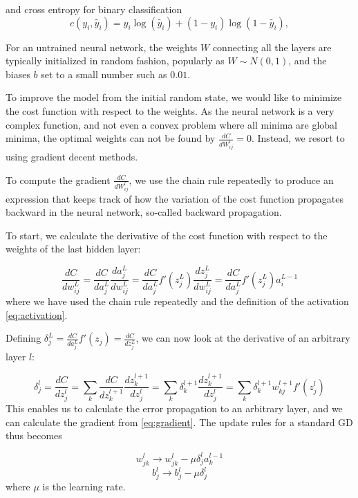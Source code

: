and cross entropy for binary classification
\begin{equation}\label{eq:square_loss}
    c(y_i, \tilde{y_i}) = y_i\log(\tilde{y_i}) + (1 - y_i)\log(1 - \tilde{y_i}),
\end{equation}

For an untrained neural network, the weights $W$ connecting all the layers are typically initialized in random fashion, popularly as $W \sim N(0,1)$, and the biases $b$ set to a small number such as $0.01$. 

To improve the model from the initial random state, we would like to minimize the cost function with respect to the weights. As the neural network is a very complex function, and not even a convex problem where all minima are global minima, the optimal weights can not be found by $\frac{dC}{dW^l_{ij}} = 0$. Instead, we resort to using gradient decent methods.

To compute the gradient $\frac{dC}{dW^l_{ij}}$, we use the chain rule repeatedly to produce an expression that keeps track of how the variation of the cost function propagates backward in the neural network, so-called backward propagation.

To start, we calculate the derivative of the cost function with respect to the weights of the last hidden layer:

\begin{equation}\label{eq:gradient}
    \frac{dC}{dw^L_{ij}} = \frac{dC}{da_j^L} \frac{da_j^L}{dw^L_{ij}} 
    = \frac{dC}{da_j^L} f'(z_j^L) \frac{dz^L_j}{dw^L_{ij}} = \frac{dC}{da_j^L} f'(z_j^L) a^{L-1}_i
\end{equation}
where we have used the chain rule repeatedly and the definition of the activation \autoref{eq:activation}.

Defining $\delta_j^L = \frac{dC}{da_j^L} f'(z_j) = \frac{dC}{dz_j^L}$, we can now look at the derivative of an arbitrary layer $l$:

\begin{equation}\label{eq:Backward}
   \delta_j^l = \frac{dC}{dz^l_j} = \sum_k \frac{dC}{dz^{l+1}_k} \frac{dz^{l+1}_k}{dz^{l}_j} = \sum_k \delta_k^{l+1} \frac{dz^{l+1}_k}{dz^{l}_j}
   = \sum_k \delta_k^{l+1} w_{kj}^{l+1}f'(z^l_j)
\end{equation}
This enables us to calculate the error propagation to an arbitrary layer, and we can calculate the gradient from \autoref{eq:gradient}. The update rules for a standard GD thus becomes

\begin{equation}\label{eq:grad step}
    w^l_{jk} \rightarrow w^l_{jk} - \mu \delta_j^l a_k^{l-1}  
\end{equation}
\begin{equation*}\label{}
    b^l_{j} \rightarrow b^l_{j} - \mu \delta_j^l 
\end{equation*}
where $\mu$ is the learning rate.


